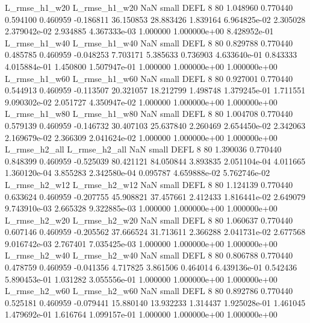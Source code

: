  L_rmse_h1_w20  L_rmse_h1_w20                   NaN      small     DEFL                 8 80 1.048960       0.770440 0.594100       0.460959   -0.186811     36.150853     28.883426     1.839164   6.964825e-02  2.305028 2.379042e-02     2.934885   4.367333e-03            1.000000    1.000000e+00        8.428952e-01
 L_rmse_h1_w40  L_rmse_h1_w40                   NaN      small     DEFL                 8 80 0.829788       0.770440 0.485785       0.460959   -0.048253      7.703171      5.385633     0.736903   4.633640e-01  0.843333 4.015884e-01     1.450800   1.507947e-01            1.000000    1.000000e+00        1.000000e+00
 L_rmse_h1_w60  L_rmse_h1_w60                   NaN      small     DEFL                 8 80 0.927001       0.770440 0.544913       0.460959   -0.113507     20.321057     18.212799     1.498748   1.379245e-01  1.711551 9.090302e-02     2.051727   4.350947e-02            1.000000    1.000000e+00        1.000000e+00
 L_rmse_h1_w80  L_rmse_h1_w80                   NaN      small     DEFL                 8 80 1.004708       0.770440 0.579139       0.460959   -0.146732     30.407103     25.637840     2.260469   2.654450e-02  2.342063 2.169679e-02     2.366309   2.041624e-02            1.000000    1.000000e+00        1.000000e+00
 L_rmse_h2_all  L_rmse_h2_all                   NaN      small     DEFL                 8 80 1.390036       0.770440 0.848399       0.460959   -0.525039     80.421121     84.050844     3.893835   2.051104e-04  4.011665 1.360120e-04     3.855283   2.342580e-04            0.095787    4.659888e-02        5.762746e-02
 L_rmse_h2_w12  L_rmse_h2_w12                   NaN      small     DEFL                 8 80 1.124139       0.770440 0.633624       0.460959   -0.207755     45.908821     37.457661     2.412433   1.816441e-02  2.649079 9.743910e-03     2.665328   9.322885e-03            1.000000    1.000000e+00        1.000000e+00
 L_rmse_h2_w20  L_rmse_h2_w20                   NaN      small     DEFL                 8 80 1.060637       0.770440 0.607146       0.460959   -0.205562     37.666524     31.713611     2.366288   2.041731e-02  2.677568 9.016742e-03     2.767401   7.035425e-03            1.000000    1.000000e+00        1.000000e+00
 L_rmse_h2_w40  L_rmse_h2_w40                   NaN      small     DEFL                 8 80 0.806788       0.770440 0.478759       0.460959   -0.041356      4.717825      3.861506     0.464014   6.439136e-01  0.542436 5.890453e-01     1.031282   3.055556e-01            1.000000    1.000000e+00        1.000000e+00
 L_rmse_h2_w60  L_rmse_h2_w60                   NaN      small     DEFL                 8 80 0.892786       0.770440 0.525181       0.460959   -0.079441     15.880140     13.932233     1.314437   1.925028e-01  1.461045 1.479692e-01     1.616764   1.099157e-01            1.000000    1.000000e+00        1.000000e+00
